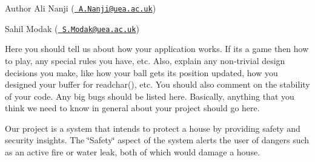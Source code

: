\begin{DoxyAuthor}{Author}
Ali Nanji (\href{mailto:A.Nanji@uea.ac.uk}{\texttt{ A.\+Nanji@uea.\+ac.\+uk}}) 

Sahil Modak (\href{mailto:S.Modak@uea.ac.uk}{\texttt{ S.\+Modak@uea.\+ac.\+uk}})
\end{DoxyAuthor}
Here you should tell us about how your application works. If it\textquotesingle{}s a game then how to play, any special rules you have, etc. Also, explain any non-\/trivial design decisions you make, like how your ball gets its position updated, how you designed your buffer for readchar(), etc. You should also comment on the stability of your code. Any big bugs should be listed here. Basically, anything that you think we need to know in general about your project should go here.

Our project is a system that intends to protect a house by providing safety and security insights. The \char`\"{}\+Safety\char`\"{} aspect of the system alerts the user of dangers such as an active fire or water leak, both of which would damage a house. 
